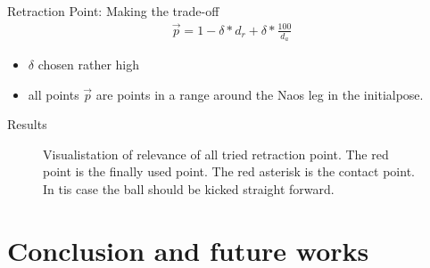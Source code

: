 \documentclass{beamer}
\begin{document}
\begin{frame}{Retraction Point: Making the trade-off}
\begin{align*}
    \vec{p} = 1-\delta * d_r + \delta * \frac{100}{d_a}
\end{align*}

\begin{itemize}
    \item $\delta$ chosen rather high
    \item all points $\vec{p}$ are points in a range around the Naos leg in
        the initialpose. 
\end{itemize}
\end{frame}

\begin{frame}{Results}
\begin{figure}[htbp]
  \centering
  \caption{Visualistation of relevance of all tried retraction point. The red
      point is the finally used point. The red asterisk is the contact point. In
      tis case the ball should be kicked straight forward.
         }
  \label{fig:retraction_plot1}
\end{figure}
\end{frame}
\section{Conclusion and future works}
\end{document}
